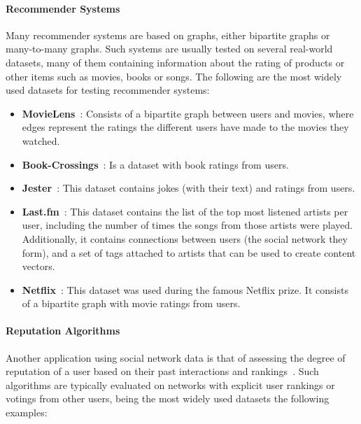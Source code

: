 \paragraph{Recommender Systems}

Many recommender systems are based on graphs, either bipartite graphs or
many-to-many graphs. Such systems are usually tested on several real-world datasets,
many of them containing information about the rating of products or other items such
as movies, books or songs. The following are the most widely used datasets for
testing recommender systems:

\begin{itemize}
\item \textbf{MovieLens}~\cite{movielens}: Consists of a bipartite graph
  between users and movies, where edges represent the ratings the different
  users have made to the movies they watched.
\item \textbf{Book-Crossings}~\cite{ziegler2005improving}: Is a dataset with book ratings
  from users.
\item \textbf{Jester}~\cite{goldberg2001eigentaste}: This dataset contains jokes (with
  their text) and ratings from users.
\item \textbf{Last.fm}~\cite{hetrec}: This dataset contains the list of the top
  most listened artists per user, including the number of times the songs from
  those artists were played. Additionally, it contains connections between users
  (the social network they form), and a set of tags attached to artists that can
  be used to create content vectors.
\item \textbf{Netflix}~\cite{zhou2008large}: This dataset was used during the famous
  Netflix prize. It consists of a bipartite graph with movie ratings from users.
\end{itemize}

\paragraph{Reputation Algorithms}

Another application using social network data is that of assessing the degree of
reputation of a user based on their past interactions and
rankings~\cite{kamvar2003eigentrust,katz2006social,kumar2016edge}. Such
algorithms are typically evaluated on networks with explicit user rankings or
votings from other users, being the most widely used datasets the following
examples:

